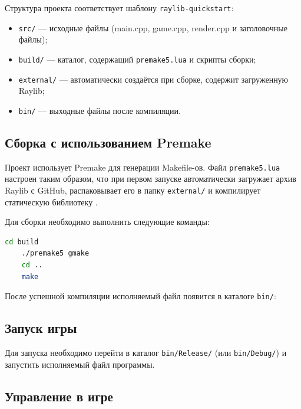 \documentclass[../main.tex]{subfiles}
\begin{document}
Структура проекта соответствует шаблону \texttt{raylib-quickstart}:
\begin{itemize}
	\item \texttt{src/} — исходные файлы (main.cpp, game.cpp, render.cpp и заголовочные файлы);
	\item \texttt{build/} — каталог, содержащий \texttt{premake5.lua} и скрипты сборки;
	\item \texttt{external/} — автоматически создаётся при сборке, содержит загруженную Raylib;
	\item \texttt{bin/} — выходные файлы после компиляции.
\end{itemize}

\subsection{Сборка с использованием Premake}\label{subsec:premake}

Проект использует Premake для генерации Makefile-ов. Файл \texttt{premake5.lua} настроен таким образом, что при первом запуске автоматически загружает архив Raylib с GitHub, распаковывает его в папку \texttt{external/} и компилирует статическую библиотеку \cite{premake_docs}. 

Для сборки необходимо выполнить следующие команды:

\begin{lstlisting}[language=bash, caption={Сборка через Premake}]
	cd build
	./premake5 gmake
	cd ..
	make
\end{lstlisting}


После успешной компиляции исполняемый файл появится в каталоге \texttt{bin/}:

\subsection{Запуск игры}

Для запуска необходимо перейти в каталог \texttt{bin/Release/} (или \texttt{bin/Debug/}) и запустить исполняемый файл программы.

\subsection{Управление в игре}
\end{document}
